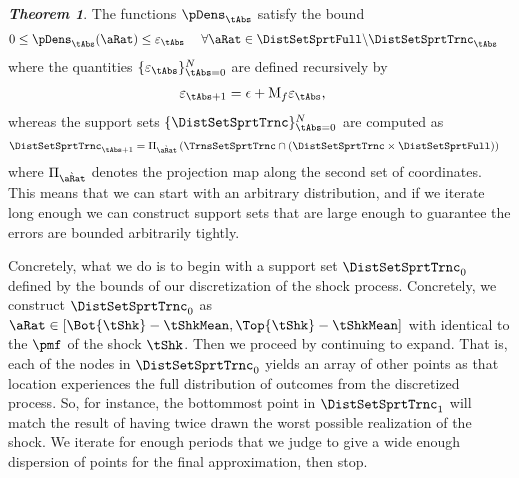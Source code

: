 \documentclass[../BufferStockTheory.tex]{subfiles}\usepackage{ApndxSteadyState}
\begin{document}
  \textit{\textbf{Theorem 1}}. The functions $\pDens_{\tAbs}$ satisfy the bound
  \begin{equation}\begin{gathered}\begin{aligned}
    0 & \leq \pDens_{\tAbs}(\point) \leq \varepsilon_{\tAbs}~~~~\forall \point \in \DistSetSprtFull \backslash \DistSetSprtTrnc_{\tAbs}
  \end{aligned}\end{gathered}\end{equation}
\noindent where the quantities $\{\varepsilon_{\tAbs}\}_{\tAbs=0}^{N}$ are defined recursively by
  \begin{equation}\begin{gathered}\begin{aligned}
    \varepsilon_{\tAbs+1} &= \epsilon + \mathrm{M}_{f}\varepsilon_{\tAbs},
  \end{aligned}\end{gathered}\end{equation}
  whereas the support sets $\{\DistSetSprtTrnc\}_{\tAbs=0}^{N}$ are computed as
  \begin{equation}\begin{gathered}\begin{aligned}
    \DistSetSprtTrnc_{\tAbs+1} &= \Pi_{\Nxt{\point}}\left(\TrnsSetSprtTrnc \cap (\DistSetSprtTrnc \times \DistSetSprtFull)\right)
  \end{aligned}\end{gathered}\end{equation}
  where $\Pi_{\Nxt{\point}}$ denotes the projection map along the second set of coordinates.
  This means that we can start with an arbitrary distribution, and if we iterate long enough we can construct support sets that are large enough to guarantee the errors are bounded arbitrarily tightly.

  Concretely, what we do is to begin with a support set $\DistSetSprtTrnc_{0}$ defined by the bounds of our discretization of the shock process. Concretely, we construct $\DistSetSprtTrnc_{0}$ as $\point \in [\Bot{\tShk}-\tShkMean,\Top{\tShk}-\tShkMean]$ with {\pmf} identical to the $\pmf$ of the shock $\tShk$.  Then we proceed by continuing to expand.  That is, each of the nodes in $\DistSetSprtTrnc_{0}$ yields an array of other points as that location experiences the full distribution of outcomes from the discretized process.  So, for instance, the bottommost point in $\DistSetSprtTrnc_{1}$ will match the result of having twice drawn the worst possible realization of the shock.  We iterate for enough periods that we judge to give a wide enough dispersion of points for the final approximation, then stop.
\end{document}
